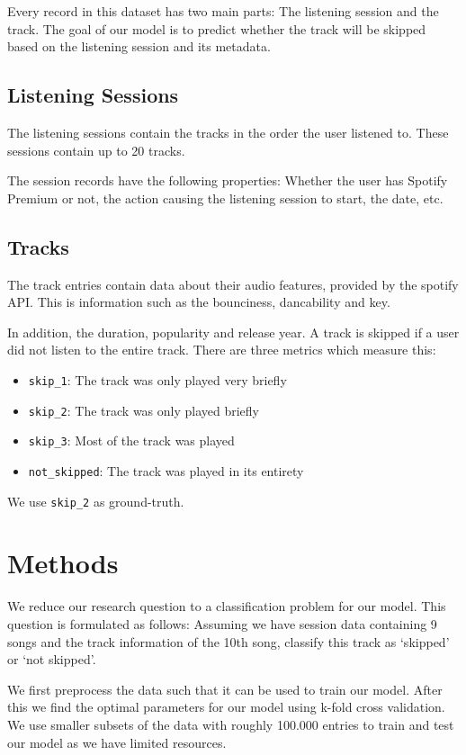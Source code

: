 \documentclass[conference]{IEEEtran}
\begin{document}
Every record in this dataset has two main parts: The listening session and the track. 
The goal of our model is to predict whether the track will be skipped based on the listening session and its metadata.

\subsection{Listening Sessions}
The listening sessions contain the tracks in the order the user listened to. These sessions contain up to 20 tracks.

The session records have the following properties: 
Whether the user has Spotify Premium or not, 
the action causing the listening session to start, 
the date, etc. 

\subsection{Tracks}
The track entries contain data about their audio features, 
provided by the spotify API\@. 
This is information such as the bounciness, dancability and key.

In addition, the duration, popularity and release year.
A track is skipped if a user did not listen to the entire track. There are three metrics which measure this: 
\begin{itemize}
	\item \verb|skip_1|: The track was only played very briefly
	\item \verb|skip_2|: The track was only played briefly
	\item \verb|skip_3|: Most of the track was played
	\item \verb|not_skipped|: The track was played in its entirety
\end{itemize}
We use \verb|skip_2| as ground-truth.


\section{Methods}
We reduce our research question to a classification problem for our model. 
This question is formulated as follows: Assuming we have session data containing 9 songs and the track information of the 10th song, classify this track as `skipped' or `not skipped'. 


We first preprocess the data such that it can be used to train our model.
After this we find the optimal parameters for our model using k-fold cross validation.
We use smaller subsets of the data with roughly 100.000 entries to train and test our model 
as we have limited resources. 
\end{document}
